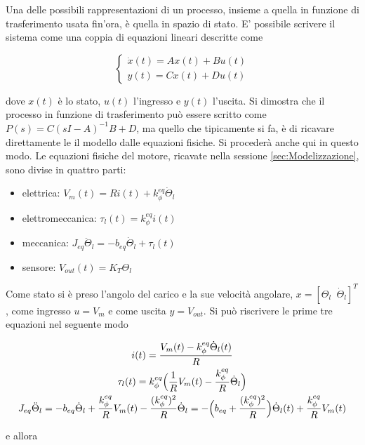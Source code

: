\documentclass[english]{article}
\newcommand{\singleSpacing}{\phantom{a}}	%
\begin{document}
		Una delle possibili rappresentazioni di un processo, insieme a quella in funzione di trasferimento usata fin'ora, è quella in spazio di stato. E' possibile scrivere il sistema come una coppia di equazioni lineari descritte come
		
		\begin{equation}
			\begin{cases}
				\dot{x}(t)=Ax(t)+Bu(t) \\
				y(t)=Cx(t)+Du(t)
			\end{cases}
		\end{equation}	
		
		\noindent dove $x(t)$ è lo stato, $u(t)$ l'ingresso e $y(t)$ l'uscita. Si dimostra che il processo in funzione di trasferimento può essere scritto come $P(s)=C(sI-A)^{-1}B+D$, ma quello che tipicamente si fa, è di ricavare direttamente le il modello dalle equazioni fisiche. Si procederà anche qui in questo modo. Le equazioni fisiche del motore, ricavate nella sessione \ref{sec:Modelizzazione}, sono divise in quattro parti:
		
		\begin{itemize}
			\item elettrica: $V_m(t)=Ri(t)+k_{\phi}^{eq}\dot{\Theta}_l$
			\item elettromeccanica: $\tau_l(t)=k_{\phi}^{eq}i(t)$
			\item meccanica: $J_{eq}\ddot{\Theta}_l=-b_{eq}\dot{\Theta}_l+\tau_l(t)$
			\item sensore: $V_{out}(t)=K_T\Theta_l$
		\end{itemize}  
		
		\noindent Come stato si è preso l'angolo del carico e la sue velocità angolare, $x=[\Theta_l \singleSpacing \dot{\Theta}_l]^T$, come ingresso $u=V_m$ e come uscita $y=V_{out}$. Si può riscrivere le prime tre equazioni nel seguente modo
		
		\begin{gather}
			i(t)=\frac{V_m(t)-k_{\phi}^{eq}\dot{\Theta}_l(t)}{R} \\
			\tau_l(t)=k_{\phi}^{eq}\Bigl(\frac{1}{R}V_m(t)-\frac{k_{\phi}^{eq}}{R}\dot{\Theta}_l\Bigl) \\
			J_{eq}\ddot{\Theta}_l=-b_{eq}\dot{\Theta}_l+\frac{k_{\phi}^{eq}}{R}V_m(t)-\frac{(k_{\phi}^{eq})^2}{R}\dot{\Theta}_l=-\Bigl(b_{eq}+\frac{(k_{\phi}^{eq})^2}{R}\Bigl)\dot{\Theta}_l(t)+\frac{k_{\phi}^{eq}}{R}V_m(t)
		\end{gather}  
		
		\noindent e allora
		
\end{document}
